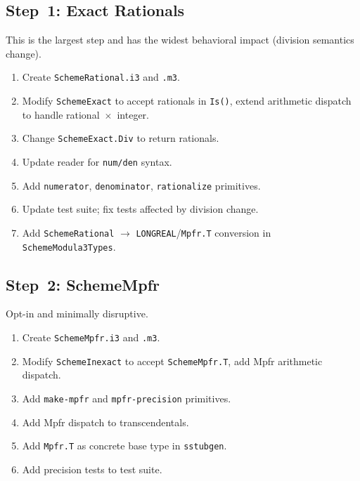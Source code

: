 \documentclass[12pt]{article}
\begin{document}
\subsection{Step~1: Exact Rationals}

This is the largest step and has the widest behavioral impact
(division semantics change).

\begin{enumerate}[nosep]
\item Create {\tt SchemeRational.i3} and {\tt .m3}.
\item Modify {\tt SchemeExact} to accept rationals in {\tt Is()},
  extend arithmetic dispatch to handle rational~$\times$~integer.
\item Change {\tt SchemeExact.Div} to return rationals.
\item Update reader for {\tt num/den} syntax.
\item Add {\tt numerator}, {\tt denominator}, {\tt rationalize}
  primitives.
\item Update test suite; fix tests affected by division change.
\item Add {\tt SchemeRational} $\to$ {\tt LONGREAL}/{\tt Mpfr.T}
  conversion in {\tt SchemeModula3Types}.
\end{enumerate}

\subsection{Step~2: SchemeMpfr}

Opt-in and minimally disruptive.

\begin{enumerate}[nosep]
\item Create {\tt SchemeMpfr.i3} and {\tt .m3}.
\item Modify {\tt SchemeInexact} to accept {\tt SchemeMpfr.T},
  add Mpfr arithmetic dispatch.
\item Add {\tt make-mpfr} and {\tt mpfr-precision} primitives.
\item Add Mpfr dispatch to transcendentals.
\item Add {\tt Mpfr.T} as concrete base type in {\tt sstubgen}.
\item Add precision tests to test suite.
\end{enumerate}
\end{document}
